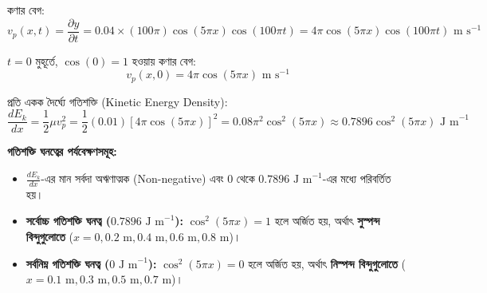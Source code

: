 \documentclass[12pt, a4paper]{article}
\begin{document}
\begin{tcolorbox}[solutionbox={সমাধান (Solution)}]
\vspace{0.5em}
\noindent
কণার বেগ:
\[ v_p(x,t) = \frac{\partial y}{\partial t} = 0.04 \times (100\pi) \cos(5\pi x) \cos(100\pi t) = 4\pi \cos(5\pi x) \cos(100\pi t)\text{ m s}^{-1} \]

\noindent
$t = 0$ মুহূর্তে, $\cos(0) = 1$ হওয়ায় কণার বেগ:
\[ v_p(x,0) = 4\pi \cos(5\pi x)\text{ m s}^{-1} \]

\noindent
প্রতি একক দৈর্ঘ্যে গতিশক্তি (Kinetic Energy Density):
\[ \frac{dE_k}{dx} = \frac{1}{2} \mu v_p^2 = \frac{1}{2} (0.01) \left[4\pi \cos(5\pi x)\right]^2 = 0.08\pi^2 \cos^2(5\pi x) \approx 0.7896 \cos^2(5\pi x)\text{ J m}^{-1} \]

\vspace{0.5em}
\noindent
\textbf{গতিশক্তি ঘনত্বের পর্যবেক্ষণসমূহ:}
\begin{itemize}[leftmargin=2em, itemsep=0.3em]
    \item $\frac{dE_k}{dx}$-এর মান সর্বদা অঋণাত্মক (Non-negative) এবং $0$ থেকে $0.7896\text{ J m}^{-1}$-এর মধ্যে পরিবর্তিত হয়।
    \item \textbf{সর্বোচ্চ গতিশক্তি ঘনত্ব ($0.7896\text{ J m}^{-1}$):} $\cos^2(5\pi x) = 1$ হলে অর্জিত হয়, অর্থাৎ \textbf{সুস্পন্দ বিন্দুগুলোতে} ($x = 0, 0.2\text{ m}, 0.4\text{ m}, 0.6\text{ m}, 0.8\text{ m}$)।
    \item \textbf{সর্বনিম্ন গতিশক্তি ঘনত্ব ($0\text{ J m}^{-1}$):} $\cos^2(5\pi x) = 0$ হলে অর্জিত হয়, অর্থাৎ \textbf{নিস্পন্দ বিন্দুগুলোতে} ($x = 0.1\text{ m}, 0.3\text{ m}, 0.5\text{ m}, 0.7\text{ m}$)।
\end{itemize}

\vspace{1.2em}
\begin{center}
\end{center}
\end{tcolorbox}
\end{document}
